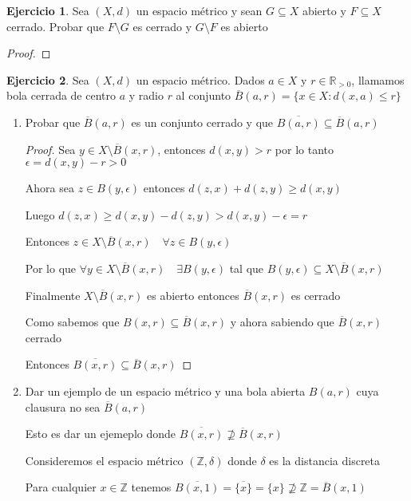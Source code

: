 \documentclass[12pt]{article}
\newcommand{\R}{\mathbb{R}}
\newcommand{\Z}{\mathbb{Z}}
\newcommand{\ol}{\overline}
\theoremstyle{definition}
\newtheorem{ej}{Ejercicio}
\begin{document}
\begin{ej}
  Sea $(X,d)$ un espacio métrico y sean $G \subseteq X$ abierto y $F \subseteq X$ cerrado. Probar que $F \setminus G$ es cerrado y $G \setminus F$ es abierto
  \begin{proof}
    
  \end{proof}
\end{ej}

\begin{ej}
Sea $(X,d)$ un espacio métrico. Dados $a \in X$ y $r \in \R_{>0}$, llamamos bola cerrada de centro $a$ y radio $r$ al conjunto $\ol{B}(a,r) = \{x \in X : d(x,a) \leq r\}$
\begin{enumerate}
  \item Probar que $\ol{B}(a,r)$ es un conjunto cerrado y que $\ol{B(a,r)} \subseteq \ol{B}(a,r)$
    \begin{proof}
      Sea $y \in X \setminus \ol{B}(x,r)$, entonces $d(x,y) > r$ por lo tanto $\epsilon = d(x,y) -r > 0$

      Ahora sea $z \in B(y,\epsilon)$ entonces $d(z,x) + d(z,y) \geq d(x,y)$

      Luego $d(z,x) \geq d(x,y) - d(z,y) > d(x,y) - \epsilon = r $

      Entonces $z \in X \setminus \ol{B}(x,r) \quad \forall z \in B(y,\epsilon)$

      Por lo que $\forall y \in X \setminus \ol{B}(x,r) \quad \exists B(y,\epsilon) $ tal que $ B(y,\epsilon) \subseteq X \setminus \ol{B}(x,r)$

      Finalmente $X \setminus \ol{B}(x,r)$ es abierto entonces $\ol{B}(x,r)$ es cerrado

      Como sabemos que $B(x,r)\subseteq \ol{B}(x,r)$ y ahora sabiendo que $\ol{B}(x,r)$ cerrado

      Entonces $\ol{B(x,r)} \subseteq \ol{B}(x,r)$
    \end{proof}
  \item Dar un ejemplo de un espacio métrico y una bola abierta $B(a,r)$ cuya clausura no sea $\ol{B}(a,r)$

    Esto es dar un ejemeplo donde $\ol{B(x,r)} \not\supseteq \ol{B}(x,r)$

    Consideremos el espacio métrico $(\Z,\delta)$ donde $\delta$ es la distancia discreta 

    Para cualquier $x \in \Z$ tenemos $\ol{B(x,1)} = \ol{\{x\}} = \{x\}\not\supseteq \Z = \ol{B}(x,1)$
\end{enumerate}
\end{ej}
\end{document}
